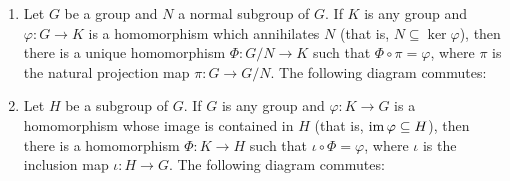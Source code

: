     \begin{example}\label{example:universal-properties}
        \phantom{a}
        \begin{enumerate}[label = (\arabic*)]
            \item Let $G$ be a group and $N$ a normal subgroup of $G$. If $K$ is any group and $\varphi:G \rightarrow K$ is a homomorphism which annihilates $N$ (that is, $N \subseteq \ker{\varphi}$), then there is a unique homomorphism $\Phi:G/N \rightarrow K$ such that $\Phi \circ \pi = \varphi$, where $\pi$ is the natural projection map $\pi: G \rightarrow G/N$. The following diagram commutes:
                    \begin{center}
                    \end{center}
            
            \item Let $H$ be a subgroup of $G$. If $G$ is any group and $\varphi: K \rightarrow G$ is a homomorphism whose image is contained in $H$ (that is, $\operatorname{im}{\varphi} \subseteq H$), then there is a homomorphism $\Phi:K \rightarrow H$ such that $\iota \circ \Phi = \varphi$, where $\iota$ is the inclusion map $\iota : H \rightarrow G$. The following diagram commutes:
                        \begin{center}
                        \end{center}
            

\end{enumerate}
\end{example}
